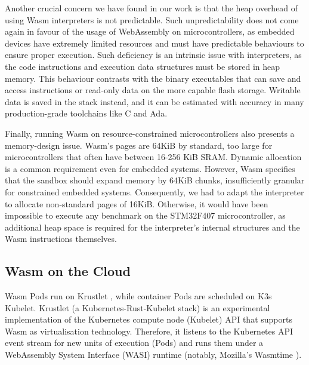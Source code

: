 

Another crucial concern we have found in our work is that the heap overhead of using Wasm interpreters is not predictable. Such unpredictability does not come again in favour of the usage of WebAssembly on microcontrollers, as embedded devices have extremely limited resources and must have predictable behaviours to ensure proper execution. Such deficiency is an intrinsic issue with interpreters, as the code instructions and execution data structures must be stored in heap memory. This behaviour contrasts with the binary executables that can save and access instructions or read-only data on the more capable flash storage. Writable data is saved in the stack instead, and it can be estimated with accuracy in many production-grade toolchains like C and Ada.

Finally, running Wasm on resource-constrained microcontrollers also presents a memory-design issue. Wasm's pages are 64KiB by standard, too large for microcontrollers that often have between 16-256 KiB SRAM. Dynamic allocation is a common requirement even for embedded systems. However, Wasm specifies that the sandbox should expand memory by 64KiB chunks, insufficiently granular for constrained embedded systems. Consequently, we had to adapt the interpreter to allocate non-standard pages of 16KiB. Otherwise, it would have been impossible to execute any benchmark on the STM32F407 microcontroller, as additional heap space is required for the interpreter's internal structures and the Wasm instructions themselves.

\subsection{Wasm on the Cloud}

Wasm Pods run on Krustlet \cite{krustlet}, while container Pods are scheduled on K3s \cite{k3s} Kubelet. Krustlet (a Kubernetes-Rust-Kubelet stack) is an experimental implementation of the Kubernetes compute node (Kubelet) API that supports Wasm as virtualisation technology. Therefore, it listens to the Kubernetes API event stream for new units of execution (Pods) and runs them under a WebAssembly System Interface (WASI) runtime (notably, Mozilla's Wasmtime \cite{wasmtime}).

